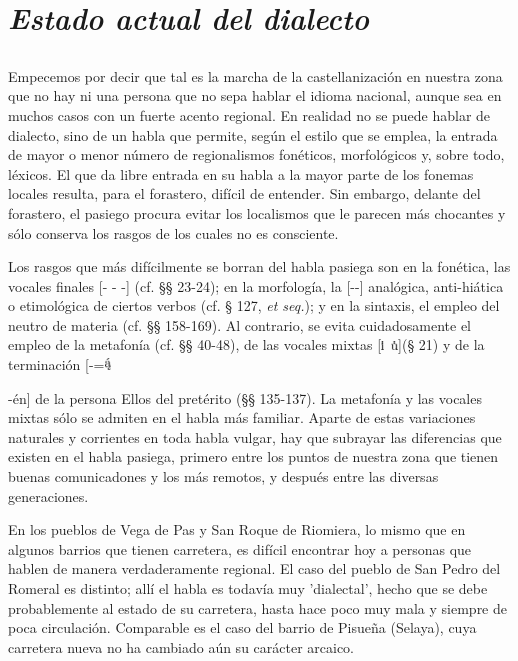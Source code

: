 \documentclass[11pt,spanish,b5paper]{book}
\newcommand{\uc}{\includegraphics[trim=0.0em 0.15ex 0.0em 0.0em, clip, width=0.50em]{images/chars/u_central.eps}}
\newcommand{\ic}{\includegraphics[trim=0.0em 0.15ex 0.0em 0.0em, clip, width=0.215em]{images/chars/i_central.eps}}
\newcommand{\apt}{\begingroup\setbox0=\hbox{\includegraphics[trim=0em 0.15ex 0.0em 0.0em,clip,width=0.45em]{images/chars/a_palatal_tilde.eps}}\parbox{\wd0}{\box0}\endgroup}
\begin{document}
\section{\emph{Estado actual del dialecto}}
\subsection{} Empecemos por decir que tal es la marcha de la castellanización en nuestra zona que no hay ni una persona que no sepa hablar el idioma nacional, aunque sea en muchos casos con un fuerte acento regional. En realidad no se puede hablar de dialecto, sino de un habla que permite,  según el estilo que se emplea, la entrada de mayor o menor número de regionalismos fonéticos, morfológicos y, sobre todo, léxicos. El que da libre entrada en su habla a la mayor parte de los fonemas locales resulta, para el forastero, difícil de entender. Sin embargo, delante del forastero, el pasiego procura evitar los localismos que le parecen más chocantes y sólo conserva los rasgos de los cuales no es consciente.

Los rasgos que más difícilmente se borran del habla pasiega son en la fonética, las vocales finales [- - -] 
(cf. §§ 23-24); en la morfología, la [--] analógica, anti-hiática o etimológica de ciertos verbos (cf. § 127, \emph{et seq.}); y en la sintaxis, el empleo del neutro de materia (cf. §§ 158-169). Al contrario, se evita cuidadosamente el empleo de la metafonía (cf. §§ 40-48), de las vocales mixtas [\ic\ \uc](§ 21) y de la terminación [-\apt{} -én]
 de la persona Ellos del pretérito (§§ 135-137). La metafonía y las vocales mixtas sólo se admiten en el habla más familiar.
Aparte de estas variaciones naturales y corrientes en toda habla vulgar, hay que subrayar las diferencias que existen en el habla pasiega, primero entre los puntos de nuestra zona que tienen buenas comunicadones y los más remotos, y después entre las diversas generaciones. 

En los pueblos de Vega de Pas y San Roque de Riomiera, lo mismo que en algunos barrios que tienen carretera, es difícil encontrar hoy a personas que hablen de manera verdaderamente regional. El caso del pueblo de San Pedro del Romeral es distinto; allí el habla es todavía
muy 'dialectal', hecho que se debe probablemente al estado de su carretera, hasta hace poco muy mala y siempre de poca circulación. Comparable es el caso del barrio de Pisueña (Selaya), cuya carretera nueva no ha cambiado aún su carácter arcaico. 
\end{document}
